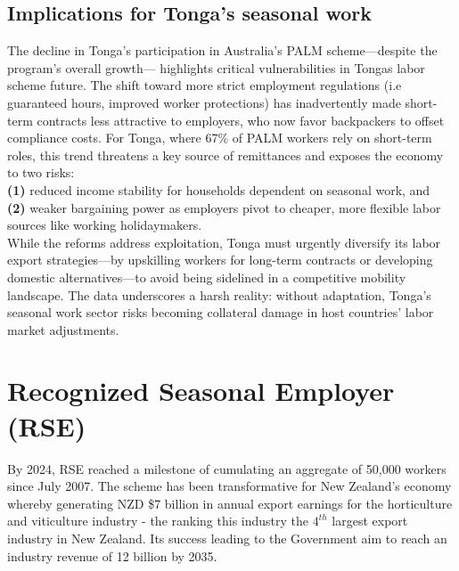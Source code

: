 \documentclass[9pt,a4paper,twocolumn,twoside]{tau-class/tau}
\begin{document}
\subsection*{Implications for Tonga's seasonal work}

The decline in Tonga’s participation in Australia’s PALM scheme—despite the program’s overall growth— highlights critical vulnerabilities in Tongas labor scheme future. The shift toward more strict employment regulations (i.e guaranteed hours, improved worker protections) has inadvertently made short-term contracts less attractive to employers, who now favor backpackers to offset compliance costs. For Tonga, where 67\% of PALM workers rely on short-term roles, this trend threatens a key source of remittances and exposes the economy to two risks: \\ \textbf{(1)} reduced income stability for households dependent on seasonal work, and \\ \textbf{(2)} weaker bargaining power as employers pivot to cheaper, more flexible labor sources like working holidaymakers. \\

While the reforms address exploitation, Tonga must urgently diversify its labor export strategies—by upskilling workers for long-term contracts or developing domestic alternatives—to avoid being sidelined in a competitive mobility landscape. The data underscores a harsh reality: without adaptation, Tonga’s seasonal work sector risks becoming collateral damage in host countries’ labor market adjustments.

\newpage

\newpage

\section{Recognized Seasonal Employer (RSE)}


		
    \begin{tauenv}[frametitle=Background]
    By 2024, RSE reached a milestone of cumulating an aggregate of 50,000 workers since July 2007. The scheme has been transformative for New Zealand's economy whereby generating NZD \$7 billion in annual export earnings for the horticulture and viticulture industry - the ranking this industry the $4^{th}$ largest export industry in New Zealand. Its success leading to the Government aim to reach an industry revenue of 12 billion by 2035.        
\end{tauenv}
		
\end{document}
